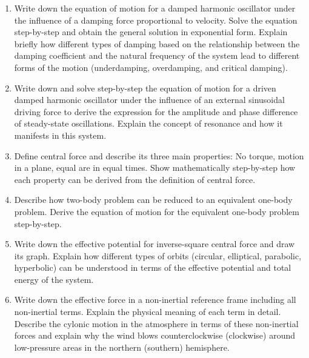 \documentclass[11pt]{article}
\begin{document}
\begin{enumerate}
	\item Write down the equation of motion for a damped harmonic oscillator under the influence of a damping force proportional to velocity. Solve the equation step-by-step and obtain the general solution in exponential form. Explain briefly how different types of damping based on the relationship between the damping coefficient and the natural frequency of the system lead to different forms of the motion (underdamping, overdamping, and critical damping).
	\item Write down and solve step-by-step the equation of motion for a driven damped harmonic oscillator under the influence of an external sinusoidal driving force to derive the expression for the amplitude and phase difference of steady-state oscillations. Explain the concept of resonance and how it manifests in this system.
	\item Define central force and describe its three main properties: No torque, motion in a plane, equal are in equal times. Show mathematically step-by-step how each property can be derived from the definition of central force.
	\item Describe how two-body problem can be reduced to an equivalent one-body problem. Derive the equation of motion for the equivalent one-body problem step-by-step.
	\item Write down the effective potential for inverse-square central force and draw its graph. Explain how different types of orbits (circular, elliptical, parabolic, hyperbolic) can be understood in terms of the effective potential and total energy of the system.
	\item Write down the effective force in a non-inertial reference frame including all non-inertial terms. Explain the physical meaning of each term in detail. Describe the cylonic motion in the atmosphere in terms of these non-inertial forces and explain why the wind blows counterclockwise (clockwise) around low-pressure areas in the northern (southern) hemisphere.

\end{enumerate}
\end{document}
